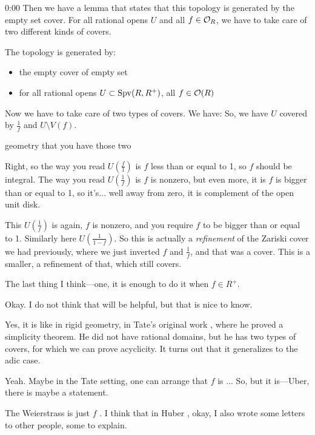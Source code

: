 \begin{unfinished}{0:00}
Then we have a lemma that states that this topology is generated by the empty set cover. 
For all rational opens $U$ and all $f \in \mathcal O_R$, we have to take care of two different kinds of covers. 

\begin{lemma}
The topology is generated by:
\begin{itemize}
	\item the empty cover of empty set
	\item for all rational opens $U \subset \operatorname{Spv}(R,R^+)$, all $f \in \mathcal O(R)$ 
\end{itemize}
\end{lemma}

Now we have to take care of two types of covers.
We have:
% 
So, we have $U$ covered by $\frac{1}{f}$ and $U \setminus V(f)$. 

\gabber geometry that you have those two 

\answer Right, so the way you read $U(\frac{f}{1})$ is $f$ less than or equal to 1, so $f$ should be integral.
The way you read $U(\frac{1}{f})$ is $f$ is nonzero, but even more, it is $f$ is bigger than or equal to 1, so it's... well away from zero, it is complement of the open unit disk.


This $U(\frac{1}{f})$ is again, $f$ is nonzero, and you require $f$ to be bigger than or equal to 1. Similarly here $U(\frac{1}{1-f})$. So this is actually a \emph{refinement} of the Zariski cover we had previously, where we just inverted $f$ and $\frac{1}{f}$, and that was a cover.
This is a smaller, a refinement of that, which still covers.

\gabber The last thing I think---one, it is enough to do it when $f \in R^+$. 

\answer Okay. I do not think that will be helpful, but that is nice to know. 

\gabber Yes, it is like in rigid geometry, in Tate's original work , where he proved a simplicity theorem. He did not have rational domains, but he has two types of covers, for which we can prove acyclicity. It turns out that it generalizes to the adic case.

\answer Yeah. Maybe in the Tate setting, one can arrange that $f$ is ...
 So, but it is---Uber, there is maybe a statement.

The Weierstrass is just $f$ . 
I think that in Huber , okay, I also wrote some letters to other people, some to explain.


\end{unfinished}
